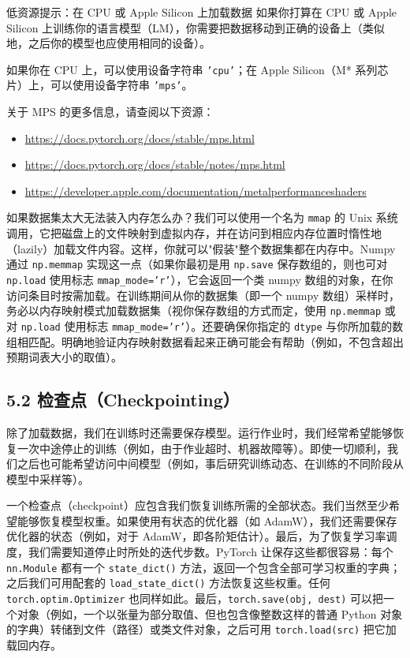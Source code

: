 \begin{tipbox}{低资源提示：在 CPU 或 Apple Silicon 上加载数据}
如果你打算在 CPU 或 Apple Silicon 上训练你的语言模型（LM），你需要把数据移动到正确的设备上（类似地，之后你的模型也应使用相同的设备）。

如果你在 CPU 上，可以使用设备字符串 \texttt{'cpu'}；在 Apple Silicon（M* 系列芯片）上，可以使用设备字符串 \texttt{'mps'}。

关于 MPS 的更多信息，请查阅以下资源：
\begin{itemize}
\item \url{https://docs.pytorch.org/docs/stable/mps.html}
\item \url{https://docs.pytorch.org/docs/stable/notes/mps.html}
\item \url{https://developer.apple.com/documentation/metalperformanceshaders}
\end{itemize}
\end{tipbox}

如果数据集太大无法装入内存怎么办？我们可以使用一个名为 \texttt{mmap} 的 Unix 系统调用，它把磁盘上的文件映射到虚拟内存，并在访问到相应内存位置时惰性地（lazily）加载文件内容。这样，你就可以"假装"整个数据集都在内存中。Numpy 通过 \texttt{np.memmap} 实现这一点（如果你最初是用 \texttt{np.save} 保存数组的，则也可对 \texttt{np.load} 使用标志 \texttt{mmap\_mode='r'}），它会返回一个类 numpy 数组的对象，在你访问条目时按需加载。在训练期间从你的数据集（即一个 numpy 数组）采样时，务必以内存映射模式加载数据集（视你保存数组的方式而定，使用 \texttt{np.memmap} 或对 \texttt{np.load} 使用标志 \texttt{mmap\_mode='r'}）。还要确保你指定的 \texttt{dtype} 与你所加载的数组相匹配。明确地验证内存映射数据看起来正确可能会有帮助（例如，不包含超出预期词表大小的取值）。

\subsection*{5.2 检查点（Checkpointing）}

除了加载数据，我们在训练时还需要保存模型。运行作业时，我们经常希望能够恢复一次中途停止的训练（例如，由于作业超时、机器故障等）。即使一切顺利，我们之后也可能希望访问中间模型（例如，事后研究训练动态、在训练的不同阶段从模型中采样等）。

一个检查点（checkpoint）应包含我们恢复训练所需的全部状态。我们当然至少希望能够恢复模型权重。如果使用有状态的优化器（如 AdamW），我们还需要保存优化器的状态（例如，对于 AdamW，即各阶矩估计）。最后，为了恢复学习率调度，我们需要知道停止时所处的迭代步数。PyTorch 让保存这些都很容易：每个 \texttt{nn.Module} 都有一个 \texttt{state\_dict()} 方法，返回一个包含全部可学习权重的字典；之后我们可用配套的 \texttt{load\_state\_dict()} 方法恢复这些权重。任何 \texttt{torch.optim.Optimizer} 也同样如此。最后，\texttt{torch.save(obj, dest)} 可以把一个对象（例如，一个以张量为部分取值、但也包含像整数这样的普通 Python 对象的字典）转储到文件（路径）或类文件对象，之后可用 \texttt{torch.load(src)} 把它加载回内存。

